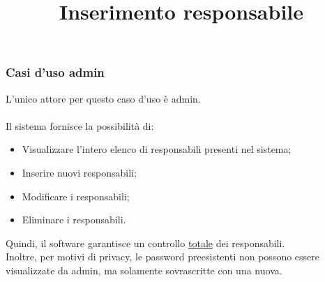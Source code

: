 \documentclass[a4paper,11pt]{article}
\begin{document}
\subsubsection{Casi d'uso admin}
\begin{center}
	\title{\textbf{Inserimento responsabile}}
	\maketitle
\end{center}
L'unico attore per questo caso d'uso è admin.\\
\:\\
Il sistema fornisce la possibilità di:
\begin{itemize}
	\item[\ding{51}] Visualizzare l'intero elenco di responsabili presenti nel sistema;
	\item[\ding{51}] Inserire nuovi responsabili;
	\item[\ding{51}] Modificare i responsabili;
	\item[\ding{51}] Eliminare i responsabili.
\end{itemize}
Quindi, il software garantisce un controllo \underline{totale} dei responsabili.\\
Inoltre, per motivi di privacy, le password preesistenti non possono essere visualizzate da admin, ma solamente sovrascritte con una nuova.
\end{document}
